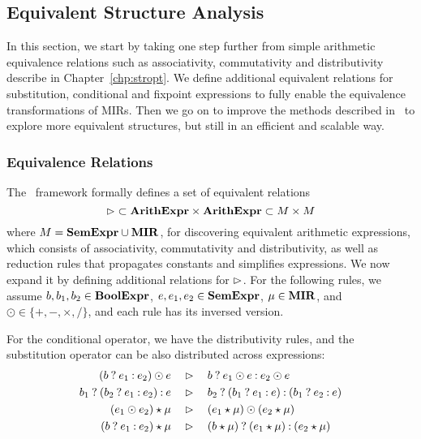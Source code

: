 \subsection{Equivalent Structure Analysis}
\label{sub:equivalence_analysis}

In this section, we start by taking one step further from simple arithmetic
equivalence relations such as associativity, commutativity and distributivity
describe in Chapter~\ref{chp:stropt}.  We define additional equivalent
relations for substitution, conditional and fixpoint expressions to fully
enable the equivalence transformations of MIRs.  Then we go on to improve the
methods described in \soap~to explore more equivalent structures, but still in
an efficient and scalable way.

\subsubsection{Equivalence Relations}

The \soap~framework formally defines a set of equivalent relations
\begin{equation}
    \mathbin{\rhd} \subset \mathbf{ArithExpr} \times \mathbf{ArithExpr} \subset M \times M
\end{equation}
where $M = \mathbf{SemExpr} \cup \mathbf{MIR}$, for discovering equivalent arithmetic
expressions, which consists of associativity, commutativity and distributivity,
as well as reduction rules that propagates constants and simplifies
expressions.  We now expand it by defining additional relations for $\mathbin{\rhd}$.
For the following rules, we assume $b, b_1, b_2 \in \mathbf{BoolExpr}$, $e, e_1, e_2
\in \mathbf{SemExpr}$, $\mu \in \mathbf{MIR}$, and $\odot \in \{+, -, \times, /\}$, and
each rule has its inversed version.

For the conditional operator, we have the distributivity rules, and the
substitution operator can be also distributed across expressions:
\begin{equation}
    \begin{aligned}
        \left(\select{b}{e_1}{e_2}\right) \odot e
        & \quad \eqrel \quad
        \select{b}{e_1 \odot e}{e_2 \odot e} \\
        \select{b_1}{\left(\select{b_2}{e_1}{e_2}\right)}{e}
        & \quad \eqrel \quad
        \select{b_2}{%
            \left(\select{b_1}{e_1}{e}\right)}{%
            \left(\select{b_1}{e_2}{e}\right)} \\
        \left( e_1 \odot e_2 \right) \expand \mu
        & \quad \eqrel \quad
        \left( e_1 \expand \mu \right) \odot \left( e_2 \expand \mu \right) \\
        \left( \select{b}{e_1}{e_2} \right) \expand \mu
        & \quad \eqrel \quad
        \select{%
            \left( b \expand \mu \right)}{%
            \left( e_1 \expand \mu \right)}{%
            \left( e_2 \expand \mu \right)}
    \end{aligned}
\end{equation}

